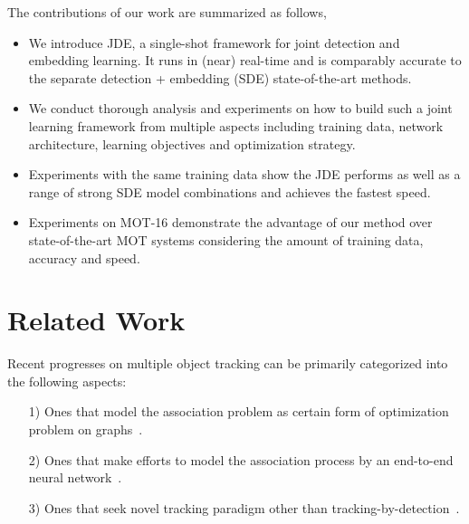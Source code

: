 \documentclass[runningheads]{llncs}
\begin{document}
The contributions of our work are summarized as follows, 


\begin{itemize}
    \item We introduce JDE, a single-shot framework for joint detection and embedding learning. It runs in (near) real-time and is comparably accurate to the separate detection + embedding (SDE) state-of-the-art methods.
    \item We conduct thorough analysis and experiments on how to build such a joint learning framework from multiple aspects including training data, network architecture, learning objectives and  optimization strategy.
    \item Experiments with the same training data show the JDE performs as well as  a range of strong SDE model combinations and achieves the fastest speed.
    \item Experiments on  MOT-16 demonstrate the advantage of our method over state-of-the-art MOT systems considering the amount of training data, accuracy and speed. 
\end{itemize}








\section{Related Work}


Recent progresses on multiple object tracking can be primarily categorized into the following aspects: 
\begin{enumerate}
    \item[1)] Ones that model the association problem as certain form of optimization problem on graphs~\cite{graph1,graph2,graph3}.
    \item[2)] Ones that make efforts to model the association process by an end-to-end neural network~\cite{e2e1,e2e2}.
    \item[3)] Ones that seek novel tracking paradigm other than tracking-by-detection~\cite{tracktor}.
\end{enumerate}
\end{document}
